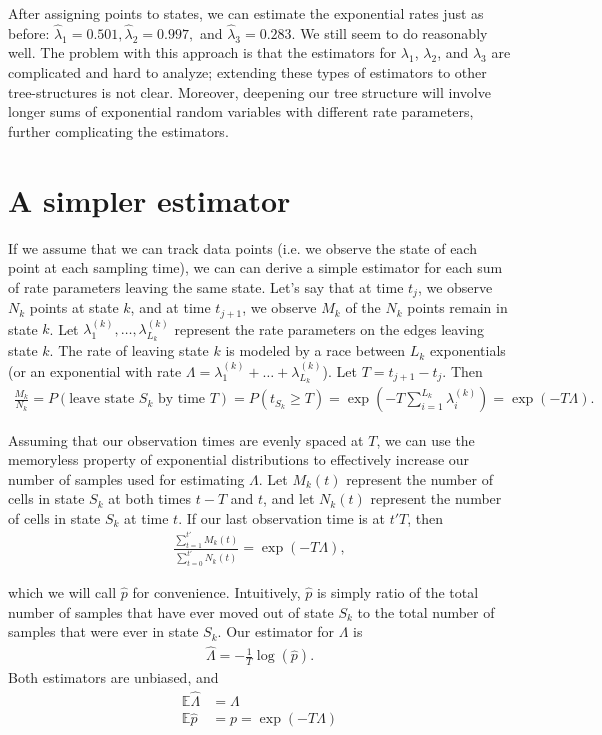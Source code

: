 \documentclass[11pt,onecolumn]{article}
\begin{document}
After assigning points to states, we can estimate the exponential rates just as before: $\hat{\lambda}_1 = 0.501, \hat{\lambda}_2 = 0.997,$ and $\hat{\lambda}_3 = 0.283$. We still seem to do reasonably well. The problem with this approach is that the estimators for $\lambda_1$, $\lambda_2$, and $\lambda_3$ are complicated and hard to analyze; extending these types of estimators to other tree-structures is not clear. Moreover, deepening our tree structure will involve longer sums of exponential random variables with different rate parameters, further complicating the estimators.

\section{A simpler estimator}
If we assume that we can track data points (i.e. we observe the state of each point at each sampling time), we can can derive a simple estimator for each sum of rate parameters leaving the same state. Let's say that at time $t_j$, we observe $N_k$ points at state $k$, and at time $t_{j+1}$, we observe $M_k$ of the $N_k$ points remain in state $k$. Let $\lambda_1^{(k)},\dots,\lambda_{L_k}^{(k)}$ represent the rate parameters on the edges leaving state $k$. The rate of leaving state $k$ is modeled by a race between $L_k$ exponentials (or an exponential with rate $\Lambda = \lambda_1^{(k)} + \dots + \lambda_{L_k}^{(k)}$). Let $T = t_{j+1}-t_j$. Then
\begin{align*}
	\frac{M_k}{N_k} = P(\mbox{leave state $S_k$ by time $T$}) = P(t_{S_k} \geq T) = \exp\left(-T \sum_{i=1}^{L_k} \lambda_i^{(k)} \right) = \exp (-T\Lambda).
\end{align*}

Assuming that our observation times are evenly spaced at $T$, we can use the memoryless property of exponential distributions to effectively increase our number of samples used for estimating $\Lambda$. Let $M_k(t)$ represent the number of cells in state $S_k$ at both times $t-T$ and $t$, and let $N_k(t)$ represent the number of cells in state $S_k$ at time $t$. If our last observation time is at $t'T$, then
\begin{align*}
	\frac{\sum_{t=1}^{t'} M_k(t)}{\sum_{t=0}^{t'} N_k(t)} = \exp(-T\Lambda),
\end{align*} 

which we will call $\hat{p}$ for convenience. Intuitively, $\hat{p}$ is simply ratio of the total number of samples that have ever moved out of state $S_k$ to the total number of samples that were ever in state $S_k$. Our estimator for ${\Lambda}$ is
\begin{align*}
	\hat{\Lambda} = - \frac{1}{T} \log ( \hat{p}). 
\end{align*}
Both estimators are unbiased, and
\begin{align*}
	\mathbb{E}\hat{\Lambda} & = \Lambda \\
	\mathbb{E}\hat{p} & = p = \exp(-T \Lambda)
\end{align*}
\end{document}
